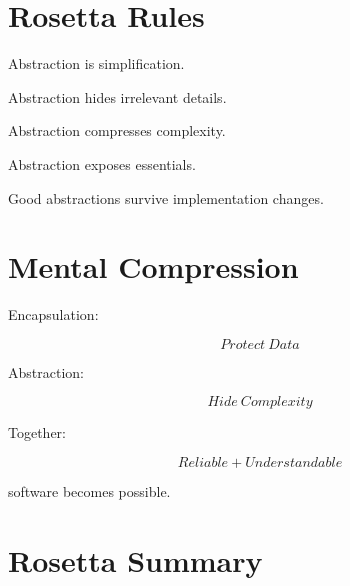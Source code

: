 \documentclass[11pt,a4paper]{book}
\begin{document}
\section{Rosetta Rules}

\begin{rosettarule}

Abstraction is simplification.

\end{rosettarule}

\begin{rosettarule}

Abstraction hides irrelevant details.

\end{rosettarule}

\begin{rosettarule}

Abstraction compresses complexity.

\end{rosettarule}

\begin{rosettarule}

Abstraction exposes essentials.

\end{rosettarule}

\begin{rosettarule}

Good abstractions survive implementation changes.

\end{rosettarule}


\section{Mental Compression}

Encapsulation:

\[
Protect\ Data
\]

Abstraction:

\[
Hide\ Complexity
\]


Together:

\[
Reliable
+
Understandable
\]

software becomes possible.\@


\section{Rosetta Summary}
\end{document}
